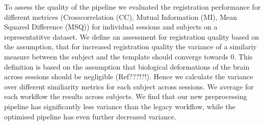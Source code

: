 To assess the quality of the pipeline we evaluated the registration performance for different metrices (Crosscorrelation (CC), Mutual Information (MI), Mean Squared Difference (MSQ)) for individual sessions and subjects on a representatitve dataset.  We define an assessment for registration quality based on the assumption, that for increased registration quality the variance of a similariy measure between the subject and the template should converge towards 0. This definition is based on the assumption that biological deformations of the brain across sessions should be negligible (Ref???!?!). Hence we calculate the variance over different similiarity metrics for each subject across sessions. We average for each workflow the results across subjects. We find that our new preprocessing pipeline has significantly less variance than the legacy workflow, while the optimised pipeline has even further decreased variance.
